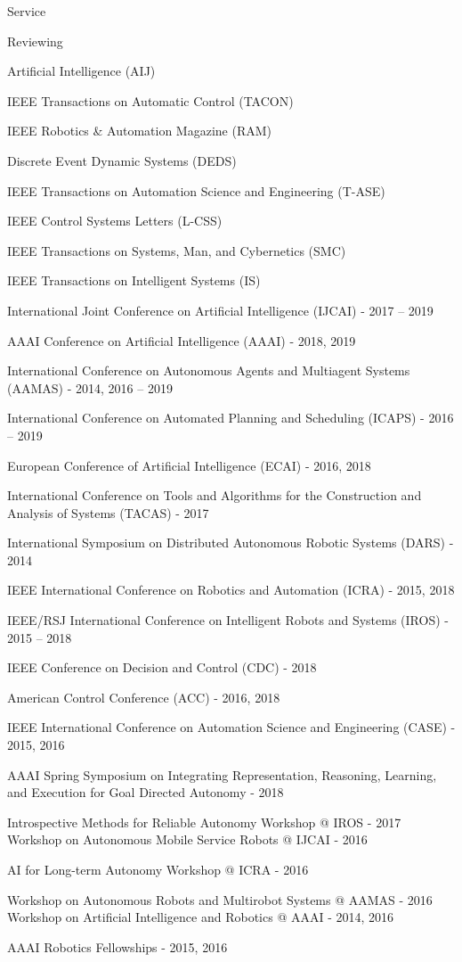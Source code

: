 \begin{rSection}{Service}
\begin{rSubsection}{Reviewing}{}{}{}
\item  Artificial Intelligence (AIJ)
\item  IEEE Transactions on Automatic Control (TACON)
\item  IEEE Robotics \& Automation Magazine (RAM)
\item  Discrete Event Dynamic Systems (DEDS)
\item  IEEE Transactions on Automation Science and Engineering (T-ASE)
\item   IEEE Control Systems Letters (L-CSS)
\item  IEEE Transactions on Systems, Man, and Cybernetics (SMC)
\item   IEEE Transactions on Intelligent Systems (IS)
\item  International Joint Conference on Artificial Intelligence (IJCAI) - 2017 -- 2019
\item  AAAI Conference on Artificial Intelligence (AAAI) - 2018, 2019
\item  International Conference on Autonomous Agents and Multiagent Systems (AAMAS) - 2014, 2016 -- 2019
\item  International Conference on Automated Planning and Scheduling (ICAPS) - 2016 -- 2019
\item  European Conference of Artificial Intelligence (ECAI) - 2016, 2018
\item  International Conference on Tools and Algorithms for the Construction and Analysis of Systems (TACAS) - 2017
\item  International Symposium on Distributed Autonomous Robotic Systems (DARS) - 2014
\item  IEEE International Conference on Robotics and Automation (ICRA) - 2015, 2018
\item  IEEE/RSJ International Conference on Intelligent Robots and Systems (IROS) - 2015 -- 2018
\item  IEEE Conference on Decision and Control (CDC) - 2018
\item  American Control Conference (ACC) - 2016, 2018
\item  IEEE International Conference on Automation Science and Engineering (CASE) - 2015, 2016
\item  AAAI Spring Symposium on Integrating Representation, Reasoning, Learning, and Execution for Goal Directed Autonomy - 2018
\item  Introspective Methods for Reliable Autonomy Workshop @ IROS - 2017 Workshop on Autonomous Mobile Service Robots @ IJCAI - 2016
\item  AI for Long-term Autonomy Workshop @ ICRA - 2016
\item  Workshop on Autonomous Robots and Multirobot Systems @ AAMAS - 2016 Workshop on Artificial Intelligence and Robotics @ AAAI - 2014, 2016
\item  AAAI Robotics Fellowships - 2015, 2016
\end{rSubsection}





\end{rSection}
